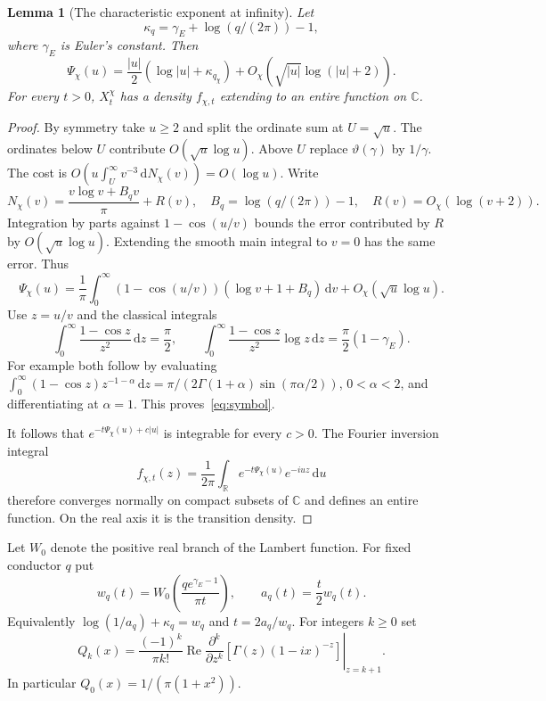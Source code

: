 \documentclass[11pt]{article}
\newtheorem{lemma}[theorem]{Lemma}
\theoremstyle{definition}
\newcommand{\R}{\mathbb R}
\newcommand{\C}{\mathbb C}
\newcommand{\Rea}{\operatorname{Re}}
\newcommand{\dd}{\,\mathrm d}
\newcommand{\abs}[1]{\left|#1\right|}
\newcommand{\angles}{\vartheta}
\begin{document}
\begin{lemma}[The characteristic exponent at infinity]\label{lem:symbol}
Let
\[
 \kappa_q=\gamma_E+\log(q/(2\pi))-1,
\]
where $\gamma_E$ is Euler's constant. Then
\begin{equation}\label{eq:symbol}
 \Psi_\chi(u)=\frac{\abs u}{2}(\log\abs u+\kappa_{q_\chi})
                +O_\chi(\sqrt{\abs u}\log(\abs u+2)).
\end{equation}
For every $t>0$, $X^\chi_t$ has a density $f_{\chi,t}$ extending to an entire
function on $\C$.
\end{lemma}

\begin{proof}
By symmetry take $u\ge2$ and split the ordinate sum at $U=\sqrt u$.
The ordinates below $U$ contribute $O(\sqrt u\log u)$. Above $U$ replace
$\angles(\gamma)$ by $1/\gamma$. The cost is
$O(u\int_U^\infty v^{-3}\dd N_\chi(v))=O(\log u)$.
Write
\[
 N_\chi(v)=\frac{v\log v+B_qv}{\pi}+R(v),
 \quad B_q=\log(q/(2\pi))-1,\quad R(v)=O_\chi(\log(v+2)).
\]
Integration by parts against $1-\cos(u/v)$ bounds the error contributed by
$R$ by $O(\sqrt u\log u)$. Extending the smooth main integral to $v=0$ has
the same error. Thus
\[
 \Psi_\chi(u)=\frac1\pi\int_0^\infty
             (1-\cos(u/v))(\log v+1+B_q)\dd v
                   +O_\chi(\sqrt u\log u).
\]
Use $z=u/v$ and the classical integrals
\[
 \int_0^\infty\frac{1-\cos z}{z^2}\dd z=\frac\pi2,
 \qquad
 \int_0^\infty\frac{1-\cos z}{z^2}\log z\dd z
                      =\frac\pi2(1-\gamma_E).
\]
For example both follow by evaluating
$\int_0^\infty(1-\cos z)z^{-1-\alpha}\dd z
=\pi/(2\Gamma(1+\alpha)\sin(\pi\alpha/2))$, $0<\alpha<2$, and
differentiating at $\alpha=1$. This proves~\eqref{eq:symbol}.

It follows that $e^{-t\Psi_\chi(u)+c\abs u}$ is integrable for every $c>0$.
The Fourier inversion integral
\[
 f_{\chi,t}(z)=\frac1{2\pi}\int_\R
                  e^{-t\Psi_\chi(u)}e^{-iuz}\dd u
\]
therefore converges normally on compact subsets of $\C$ and defines an entire
function. On the real axis it is the transition density.
\end{proof}

Let $W_0$ denote the positive real branch of the Lambert function. For fixed
conductor $q$ put
\begin{equation}\label{eq:scale}
 w_q(t)=W_0\!\left(\frac{qe^{\gamma_E-1}}{\pi t}\right),
 \qquad a_q(t)=\frac t2w_q(t).
\end{equation}
Equivalently $\log(1/a_q)+\kappa_q=w_q$ and $t=2a_q/w_q$.
For integers $k\ge0$ set
\begin{equation}\label{eq:Q}
 Q_k(x)=\frac{(-1)^k}{\pi k!}\Rea
  \left.\frac{\partial^k}{\partial z^k}
           [\Gamma(z)(1-ix)^{-z}]\right|_{z=k+1}.
\end{equation}
In particular $Q_0(x)=1/(\pi(1+x^2))$.
\end{document}
